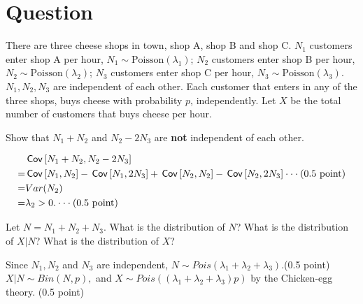 \section*{Question}
There are three cheese shops in town, shop A, shop B and shop C. $N_1$ customers enter shop A per hour, $N_1\sim \text{Poisson}(\lambda_1)$; $N_2$ customers enter shop B per hour, $N_2\sim \text{Poisson}(\lambda_2)$; $N_3$ customers enter shop C per hour, $N_3\sim \text{Poisson}(\lambda_3)$. $N_1, N_2, N_3$ are independent of each other. Each customer that enters in any of the three shops, buys cheese with probability $p$, independently. Let $X$ be the total number of customers that buys cheese per hour.
\begin{exercise}[1]
 Show that $N_1+N_2$ and $N_2-2N_3$ are \textbf{not} independent of each other.

\begin{solution}
\begin{align*}
   & \,\mathsf{Cov}\left[N_1+N_2, N_2-2N_3\right]\\
  = & \,\mathsf{Cov}\left[N_1,N_2\right]-\,\mathsf{Cov}\left[N_1,2N_3\right]+\,\mathsf{Cov}\left[N_2,N_2\right]-\,\mathsf{Cov}\left[N_2,2N_3\right]\cdot \cdot \cdot \text{(0.5 point)}\\
  = &  Var(N_2)\\
  =& \lambda_2 > 0.\cdot \cdot \cdot \text{(0.5 point)}
\end{align*}
\end{solution}
\end{exercise}

\begin{exercise}[1]
Let $N=N_1+N_2+N_3$. What is the distribution of  $N$? What is the distribution of $X|N$?  What is the distribution of $X$?
\begin{solution}
Since $N_1, N_2$ and $N_3$ are independent, $N\sim Pois(\lambda_1+\lambda_2+\lambda_3).$(0.5 point)\\
$X|N\sim Bin(N,p),$ and $X\sim Pois((\lambda_1+\lambda_2+\lambda_3) p)$ by the Chicken-egg theory. (0.5 point)
\end{solution}
\end{exercise}


